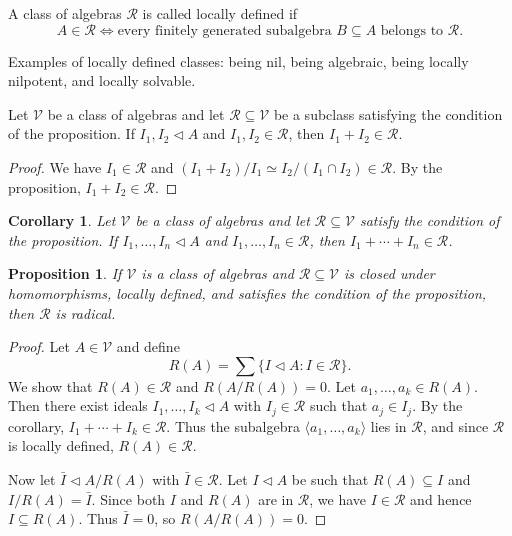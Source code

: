 \documentclass{article}
\newtheorem{proposition}[theorem]{Proposition}
\newtheorem{corollary}[theorem]{Corollary}
\begin{document}
\begin{definition}
A class of algebras $\mathcal{R}$ is called locally defined if
\[
A \in \mathcal{R} \Longleftrightarrow \text{every finitely generated subalgebra } B \subseteq A \text{ belongs to } \mathcal{R}.
\]
\end{definition}

Examples of locally defined classes: being nil, being algebraic, being locally nilpotent, and locally solvable.

\begin{lemma}
Let $\mathcal{V}$ be a class of algebras and let $\mathcal{R} \subseteq \mathcal{V}$ be a subclass satisfying the condition of the proposition. If $I_1, I_2 \triangleleft A$ and $I_1, I_2 \in \mathcal{R}$, then $I_1 + I_2 \in \mathcal{R}$.
\end{lemma}

\begin{proof}
We have $I_1 \in \mathcal{R}$ and $(I_1+I_2)/I_1 \simeq I_2/(I_1 \cap I_2) \in \mathcal{R}$. By the proposition, $I_1+I_2 \in \mathcal{R}$.
\end{proof}

\begin{corollary}
Let $\mathcal{V}$ be a class of algebras and let $\mathcal{R} \subseteq \mathcal{V}$ satisfy the condition of the proposition. If $I_1, \ldots, I_n \triangleleft A$ and $I_1, \ldots, I_n \in \mathcal{R}$, then $I_1+\cdots+I_n \in \mathcal{R}$.
\end{corollary}

\begin{proposition}
If $\mathcal{V}$ is a class of algebras and $\mathcal{R} \subseteq \mathcal{V}$ is closed under homomorphisms, locally defined, and satisfies the condition of the proposition, then $\mathcal{R}$ is radical.
\end{proposition}

\begin{proof}
Let $A \in \mathcal{V}$ and define
\[
R(A)=\sum\{I \triangleleft A : I \in \mathcal{R}\}.
\]
We show that $R(A) \in \mathcal{R}$ and $R(A / R(A))=0$. Let $a_1, \ldots, a_k \in R(A)$. Then there exist ideals $I_1, \ldots, I_k \triangleleft A$ with $I_j \in \mathcal{R}$ such that $a_j \in I_j$. By the corollary, $I_1+\cdots+I_k \in \mathcal{R}$. Thus the subalgebra $\langle a_1, \ldots, a_k\rangle$ lies in $\mathcal{R}$, and since $\mathcal{R}$ is locally defined, $R(A) \in \mathcal{R}$.

Now let $\bar{I} \triangleleft A/R(A)$ with $\bar{I} \in \mathcal{R}$. Let $I \triangleleft A$ be such that $R(A) \subseteq I$ and $I/R(A)=\bar{I}$. Since both $I$ and $R(A)$ are in $\mathcal{R}$, we have $I \in \mathcal{R}$ and hence $I \subseteq R(A)$. Thus $\bar{I}=0$, so $R(A/R(A))=0$.
\end{proof}
\end{document}
